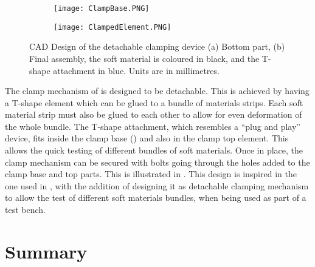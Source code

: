 \begin{figure}[htb!]
	\centering
    \begin{subfigure}[b]{0.49\textwidth}
        \centering
        \texttt{[image: ClampBase.PNG]}
        \caption{}
        \label{fig:ClampBase}
    \end{subfigure}
    \begin{subfigure}[b]{0.49\textwidth}
        \centering
        \texttt{[image: ClampedElement.PNG]}
        \caption{}
        \label{fig:ClampElement}
    \end{subfigure}
    \caption{CAD Design of the detachable clamping device (a) Bottom part, (b) Final assembly, the soft material is coloured in black, and the T-shape attachment in blue. Units are in millimetres.}
    \label{fig:ClampWhole}
\end{figure}

The clamp mechanism of  is designed to be detachable. This is achieved by having a T-shape element which can be glued to a bundle of materials strips. Each soft material strip must also be glued to each other to allow for even deformation of the whole bundle. The T-shape attachment, which resembles a ``plug and play'' device, fits inside the clamp base () and also in the clamp top element. This allows the quick testing of different bundles of soft materials. Once in place, the clamp mechanism can be secured with bolts going through the holes added to the clamp base and top parts. This is illustrated in . This design is inspired in the one used in \cite{austin2015control}, with the addition of designing it as detachable clamping mechanism to allow the test of different soft materials bundles, when being used as part of a test bench.

\section{Summary}

